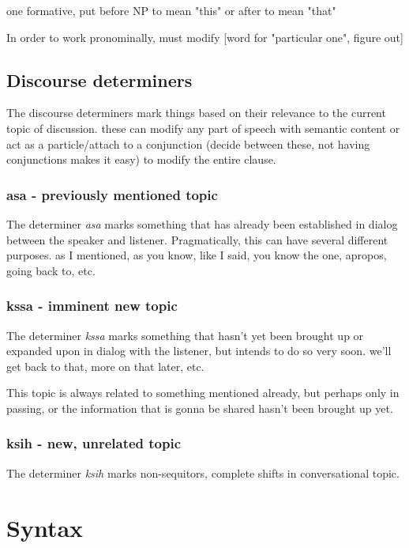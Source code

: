 \documentclass[smallroyalvopaper,9pt]{memoir}
\begin{document}
one formative, put before NP to mean "this" or after to mean "that"

In order to work pronominally, must modify [word for "particular one", figure out]

\section{Discourse determiners}

The discourse determiners mark things based on their relevance to the current topic of discussion. these can modify any part of speech with semantic content or act as a particle/attach to a conjunction (decide between these, not having conjunctions makes it easy) to modify the entire clause.

\subsection{asa - previously mentioned topic}

The determiner \textit{asa} marks something that has already been established in dialog between the speaker and listener. Pragmatically, this can have several different purposes. as I mentioned, as you know, like I said, you know the one, apropos, going back to, etc.

\subsection{kssa - imminent new topic}

The determiner \textit{kssa} marks something that hasn't yet been brought up or expanded upon in dialog with the listener, but intends to do so very soon. we'll get back to that, more on that later, etc.

This topic is always related to something mentioned already, but perhaps only in passing, or the information that is gonna be shared hasn't been brought up yet.

\subsection{ksih - new, unrelated topic}

The determiner \textit{ksih} marks non-sequitors, complete shifts in conversational topic. 

\chapter{Syntax}
\end{document}
